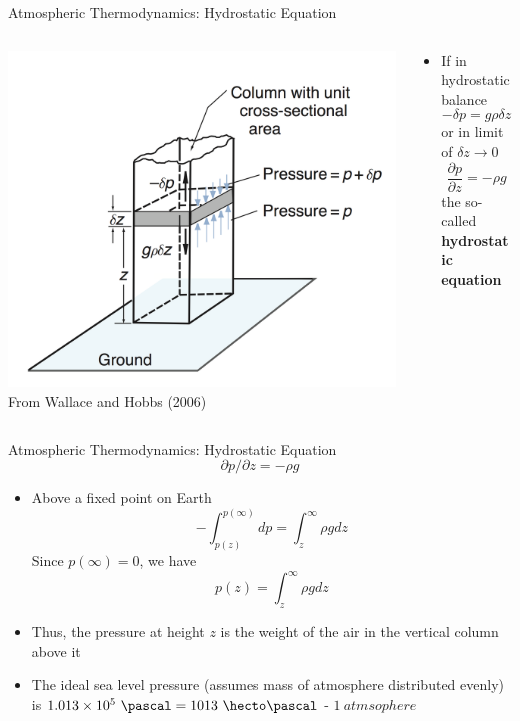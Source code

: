 \begin{frame}{Atmospheric Thermodynamics: Hydrostatic Equation}
\begin{columns}[T]
    \begin{column}{.5\textwidth}
    \begin{minipage}[c][0.8\textheight][c]{\linewidth}
    \includegraphics[width=1\textwidth]{fig1.png}\\
    \centering \small From Wallace and Hobbs (2006)
    \end{minipage}
    \end{column}
    \begin{column}{.5\textwidth}
    \begin{minipage}[c][0.8\textheight][c]{\linewidth}
   \begin{itemize}
   	\item If in hydrostatic balance
   	$$-\delta p = g\rho\delta z$$
   	or in limit of $\delta z \rightarrow 0$
   	$$\frac{\partial p}{\partial z} = -\rho g$$
   	the so-called \textbf{hydrostatic equation}
   \end{itemize}
      \end{minipage}
    \end{column}
  \end{columns} 
\end{frame}
\begin{frame}{Atmospheric Thermodynamics: Hydrostatic Equation}
$$\partial p/\partial z = -\rho g$$
\vspace{-10pt}
\begin{itemize}
	\item Above a fixed point on Earth
	$$-\int^{p(\infty)}_{p(z)} dp = \int^{\infty}_{z} \rho g dz$$
	Since $p(\infty)=0$, we have
	$$p(z) = \int^{\infty}_{z} \rho g dz$$
	\item Thus, the pressure at height $z$ is the weight of the air in the vertical column above it
	\item The ideal sea level pressure (assumes mass of atmosphere distributed evenly) is $1.013\times 10^5\ \pascal = 1013\ \hecto\pascal$ - $1\ atmsophere$
	\end{itemize}
\end{frame}
